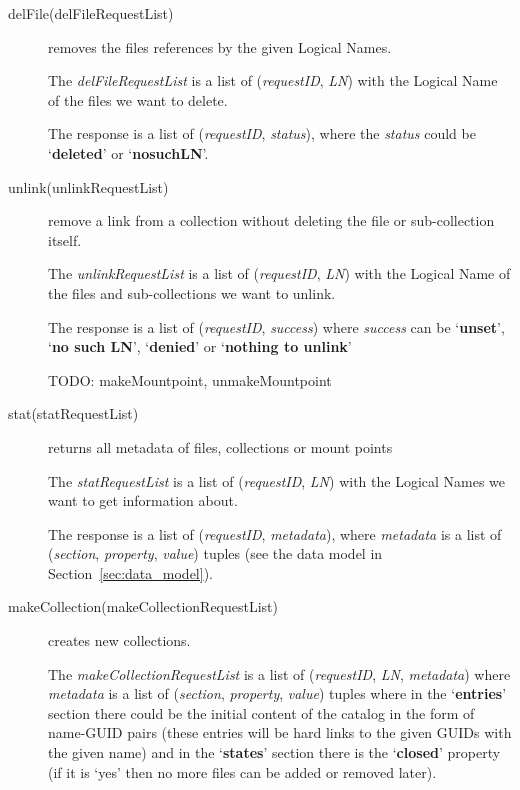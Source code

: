 \documentclass{book}
\begin{document}
\begin{description}
    \item[delFile(delFileRequestList)] removes the files references by the given Logical Names.

    The \emph{delFileRequestList} is a list of (\emph{requestID}, \emph{LN}) with the Logical Name of the files we want to delete. 
    
    The response is a list of (\emph{requestID}, \emph{status}), where the \emph{status} could be `\textbf{deleted}' or `\textbf{nosuchLN}'.
        
    \item[unlink(unlinkRequestList)] remove a link from a collection without deleting the file or sub-collection itself.
    
    The \emph{unlinkRequestList} is a list of (\emph{requestID}, \emph{LN}) with the Logical Name of the files and sub-collections we want to unlink.
    
    The response is a list of (\emph{requestID}, \emph{success}) where \emph{success} can be `\textbf{unset}', `\textbf{no such LN}', `\textbf{denied}' or `\textbf{nothing to unlink}'
    
    TODO: makeMountpoint, unmakeMountpoint
        
    \item[stat(statRequestList)] returns all metadata of files, collections or mount points

    The \emph{statRequestList} is a list of (\emph{requestID}, \emph{LN}) with the Logical Names we want to get information about.
    
    The response is a list of (\emph{requestID}, \emph{metadata}), where \emph{metadata} is a list of (\emph{section}, \emph{property}, \emph{value}) tuples (see the data model in Section~\ref{sec:data_model}).
    
    \item[makeCollection(makeCollectionRequestList)] creates new collections.
    
    The \emph{makeCollectionRequestList} is a list of (\emph{requestID}, \emph{LN}, \emph{metadata}) where \emph{metadata} is a list of (\emph{section}, \emph{property}, \emph{value}) tuples where in the `\textbf{entries}' section there could be the initial content of the catalog in the form of name-GUID pairs (these entries will be hard links to the given GUIDs with the given name) and in the `\textbf{states}' section there is the `\textbf{closed}' property (if it is `yes' then no more files can be added or removed later).
    

\end{description}
\end{document}
